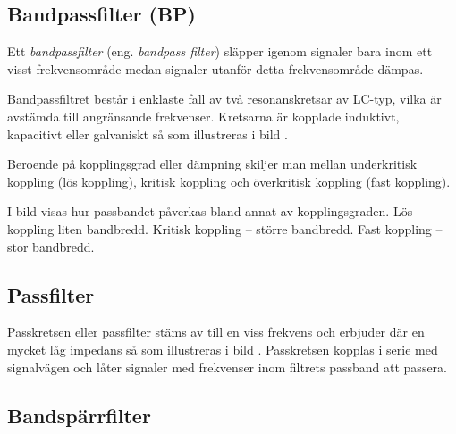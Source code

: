 \subsection{Bandpassfilter (BP)}


Ett \emph{bandpassfilter} (eng. \emph{bandpass filter}) släpper igenom signaler
bara inom ett visst frekvensområde medan signaler utanför detta frekvensområde dämpas.

Bandpassfiltret består i enklaste fall av två resonanskretsar av LC-typ, vilka
är avstämda till angränsande frekvenser. Kretsarna är kopplade induktivt,
kapacitivt eller galvaniskt så som illustreras i bild .

Beroende på kopplingsgrad eller dämpning skiljer man mellan underkritisk
koppling (lös koppling), kritisk koppling och överkritisk koppling
(fast koppling).

I bild  visas hur passbandet påverkas bland annat av kopplingsgraden.
Lös koppling liten bandbredd.
Kritisk koppling -- större bandbredd.
Fast koppling -- stor bandbredd.

\newpage

\subsection{Passfilter}

Passkretsen eller passfilter stäms av till en viss frekvens och erbjuder där
en mycket låg impedans så som illustreras i bild .
Passkretsen kopplas i serie med signalvägen och låter signaler med
frekvenser inom filtrets passband att passera.


\subsection{Bandspärrfilter}

